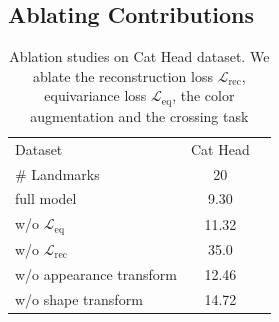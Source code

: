 
	\subsection{Ablating Contributions}\label{sec:ablation}
		\begin{table}
			\centering
			\begin{tabular}{l|cr}
				\hline
				Dataset & Cat Head    \\
				\# Landmarks &  20 \\ \hline
				full model &  9.30 \\ \hline
				w/o $\mathcal{L}_{\textrm{eq}}$   & 11.32 \\
				w/o $\mathcal{L}_{\textrm{rec}}$   & 35.0 \\
				w/o appearance transform & 12.46 \\
				w/o shape transform & 14.72 \\ \hline
			\end{tabular}
			\caption{{Ablation studies on Cat Head dataset. We ablate the reconstruction loss $\mathcal{L}_{\textrm{rec}}$, equivariance loss $\mathcal{L}_{\textrm{eq}}$, the color augmentation and the crossing task}}
			\label{tab:ablation}
		\end{table}

